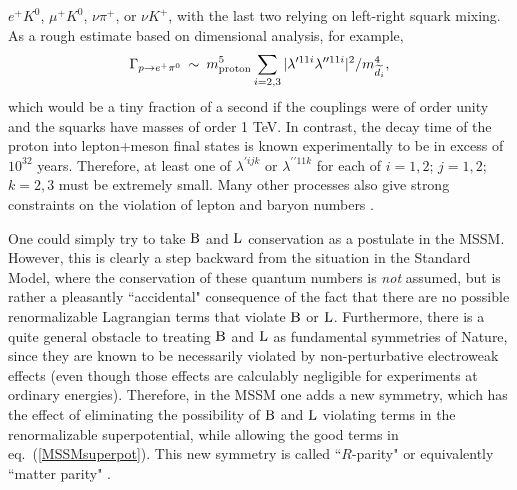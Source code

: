 \documentclass[11pt]{article}
\def\beq{\begin{eqnarray}}
\def\eeq{\end{eqnarray}}
\def\Baryon{{\rm B}}
\def\Lepton{{\rm L}}
\def\stilde{\widetilde}
\begin{document}
$e^+ K^0$, $\mu^+ K^0$, $\nu\pi^+$, or $\nu K^+$, 
with the last two relying on left-right squark mixing.
As a rough estimate based on dimensional analysis, for example,
\beq
\Gamma_{p \rightarrow e^+ \pi^0} \>\sim\> m_{{\rm proton}}^5 \sum_{i=2,3}  
|\lambda^{\prime 11i}\lambda^{\prime\prime 11i}|^2/m_{\stilde d_i}^4,
\eeq
which would be a tiny fraction of a second if the couplings were of order 
unity and the squarks have masses of order 1 TeV.  In contrast, the decay 
time of the proton into lepton+meson final states is known experimentally 
to be in excess of $10^{32}$ years. Therefore, at least one of 
$\lambda^{\prime ijk}$ or $\lambda^{\prime\prime 11k}$ for each of 
$i=1,2$; $j=1,2$; $k=2,3$ must be extremely small. Many other processes 
also give strong constraints on the violation of lepton and baryon 
numbers \cite{rparityconstraints,RPVreviews}.

One could simply try to take $\Baryon$ and $\Lepton$ conservation as a
postulate in the MSSM. However, this is clearly a step backward from the
situation in the Standard Model, where the conservation of these quantum
numbers is {\it not} assumed, but is rather a pleasantly ``accidental"
consequence of the fact that there are no possible renormalizable
Lagrangian terms that violate $\Baryon$ or $\Lepton$. Furthermore, there
is a quite general obstacle to treating $\Baryon$ and $\Lepton$ as
fundamental symmetries of Nature, since they are known to be necessarily
violated by non-perturbative electroweak effects \cite{tHooft} 
(even though those
effects are calculably negligible for experiments at ordinary energies).
Therefore, in the MSSM one adds a new symmetry, which has the effect of
eliminating the possibility of $\Baryon$ and $\Lepton$ violating terms in
the renormalizable superpotential, while allowing the good terms in
eq.~(\ref{MSSMsuperpot}). This new symmetry is called ``$R$-parity"
\cite{Rparity} or equivalently ``matter parity" \cite{matterparity}.
\end{document}
